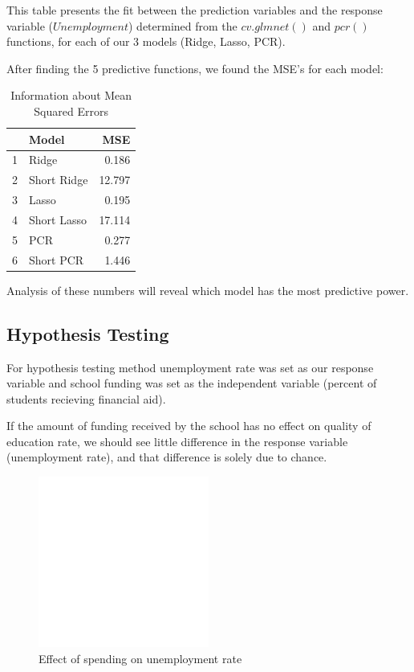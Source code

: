 \documentclass{article}\usepackage[]{graphicx}\usepackage[]{color}
\begin{document}
This table presents the fit between the prediction variables and the response variable ($Unemployment$) determined from the $cv.glmnet()$ and $pcr()$ functions, for each of our 3 models (Ridge, Lasso, PCR).

After finding the 5 predictive functions, we found the MSE's for each model:

\begin{center}

\begin{table}[ht]
\centering
\caption{Information about Mean Squared Errors} 
\begin{tabular}{rlr}
  \hline
 & Model & MSE \\ 
  \hline
1 & Ridge & 0.186 \\ 
  2 & Short Ridge & 12.797 \\ 
  3 & Lasso & 0.195 \\ 
  4 & Short Lasso & 17.114 \\ 
  5 & PCR & 0.277 \\ 
  6 & Short PCR & 1.446 \\ 
   \hline
\end{tabular}
\end{table}


\end{center}


Analysis of these numbers will reveal which model has the most predictive power.

\subsection{Hypothesis Testing}

For hypothesis testing method unemployment rate was set as our response variable and school funding was set as the independent variable (percent of students recieving financial aid).

If the amount of funding received by the school has no effect on quality of education rate, we should see little difference in the response variable (unemployment rate), and that difference is solely due to chance.


\graphicspath{ {../../images/} }
\begin{figure}
\centering
\includegraphics[width=0.5\textwidth]{unemployment}
\caption{Effect of spending on unemployment rate}
\end{figure}
\end{document}

